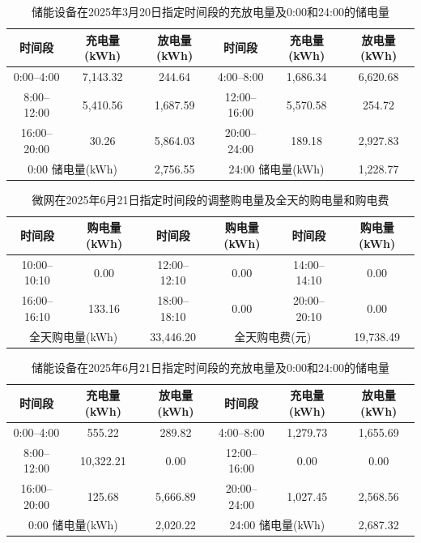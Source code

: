 \begin{table}[H]
  \centering
  \caption{储能设备在2025年3月20日指定时间段的充放电量及0:00和24:00的储电量}
  \label{tab:q3-storage-0320}
  \small
  \renewcommand{\arraystretch}{1.3}
  \begin{tabular}{|c|c|c|c|c|c|}
    \hline
    时间段 & 充电量(kWh) & 放电量(kWh) & 时间段 & 充电量(kWh) & 放电量(kWh) \\
    \hline
    0:00--4:00 & 7{,}143.32 & 244.64 & 4:00--8:00 & 1{,}686.34 & 6{,}620.68 \\
    \hline
    8:00--12:00 & 5{,}410.56 & 1{,}687.59 & 12:00--16:00 & 5{,}570.58 & 254.72 \\
    \hline
    16:00--20:00 & 30.26 & 5{,}864.03 & 20:00--24:00 & 189.18 & 2{,}927.83 \\
    \hline
    \multicolumn{2}{|c|}{0:00 储电量(kWh)} & \multicolumn{1}{c|}{2{,}756.55} & \multicolumn{2}{c|}{24:00 储电量(kWh)} & \multicolumn{1}{c|}{1{,}228.77} \\
    \hline
  \end{tabular}
\end{table}

\begin{table}[H]
  \centering
  \caption{微网在2025年6月21日指定时间段的调整购电量及全天的购电量和购电费}
  \label{tab:q3-adj-0621}
  \small
  \renewcommand{\arraystretch}{1.3}
  \begin{tabular}{|c|c|c|c|c|c|}
    \hline
    时间段 & 购电量(kWh) & 时间段 & 购电量(kWh) & 时间段 & 购电量(kWh) \\
    \hline
    10:00--10:10 & 0.00 & 12:00--12:10 & 0.00 & 14:00--14:10 & 0.00 \\
    \hline
    16:00--16:10 & 133.16 & 18:00--18:10 & 0.00 & 20:00--20:10 & 0.00 \\
    \hline
    \multicolumn{2}{|c|}{全天购电量(kWh)} & \multicolumn{1}{c|}{33{,}446.20} & \multicolumn{2}{c|}{全天购电费(元)} & \multicolumn{1}{c|}{19{,}738.49} \\
    \hline
  \end{tabular}
\end{table}

\begin{table}[H]
  \centering
  \caption{储能设备在2025年6月21日指定时间段的充放电量及0:00和24:00的储电量}
  \label{tab:q3-storage-0621}
  \small
  \renewcommand{\arraystretch}{1.3}
  \begin{tabular}{|c|c|c|c|c|c|}
    \hline
    时间段 & 充电量(kWh) & 放电量(kWh) & 时间段 & 充电量(kWh) & 放电量(kWh) \\
    \hline
    0:00--4:00 & 555.22 & 289.82 & 4:00--8:00 & 1{,}279.73 & 1{,}655.69 \\
    \hline
    8:00--12:00 & 10{,}322.21 & 0.00 & 12:00--16:00 & 0.00 & 0.00 \\
    \hline
    16:00--20:00 & 125.68 & 5{,}666.89 & 20:00--24:00 & 1{,}027.45 & 2{,}568.56 \\
    \hline
    \multicolumn{2}{|c|}{0:00 储电量(kWh)} & \multicolumn{1}{c|}{2{,}020.22} & \multicolumn{2}{c|}{24:00 储电量(kWh)} & \multicolumn{1}{c|}{2{,}687.32} \\
    \hline
  \end{tabular}
\end{table}

